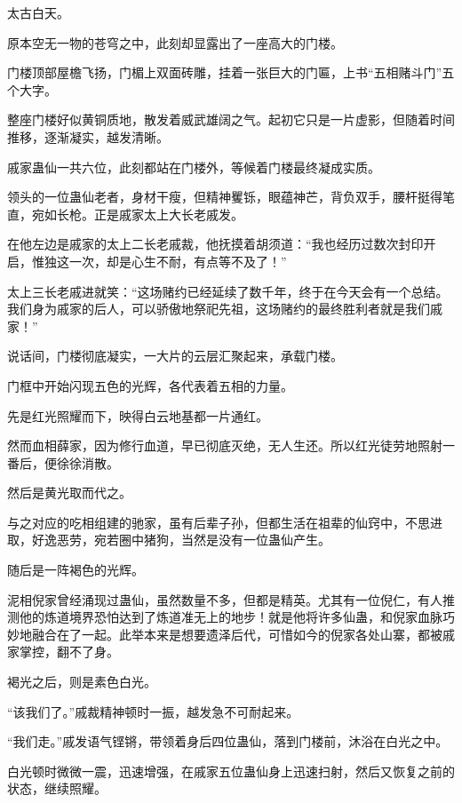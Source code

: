 
\begin{this_body}



太古白天。

原本空无一物的苍穹之中，此刻却显露出了一座高大的门楼。

门楼顶部屋檐飞扬，门楣上双面砖雕，挂着一张巨大的门匾，上书“五相赌斗门”五个大字。

整座门楼好似黄铜质地，散发着威武雄阔之气。起初它只是一片虚影，但随着时间推移，逐渐凝实，越发清晰。

戚家蛊仙一共六位，此刻都站在门楼外，等候着门楼最终凝成实质。

领头的一位蛊仙老者，身材干瘦，但精神矍铄，眼蕴神芒，背负双手，腰杆挺得笔直，宛如长枪。正是戚家太上大长老戚发。

在他左边是戚家的太上二长老戚裁，他抚摸着胡须道：“我也经历过数次封印开启，惟独这一次，却是心生不耐，有点等不及了！”

太上三长老戚进就笑：“这场赌约已经延续了数千年，终于在今天会有一个总结。我们身为戚家的后人，可以骄傲地祭祀先祖，这场赌约的最终胜利者就是我们戚家！”

说话间，门楼彻底凝实，一大片的云层汇聚起来，承载门楼。

门框中开始闪现五色的光辉，各代表着五相的力量。

先是红光照耀而下，映得白云地基都一片通红。

然而血相薛家，因为修行血道，早已彻底灭绝，无人生还。所以红光徒劳地照射一番后，便徐徐消散。

然后是黄光取而代之。

与之对应的吃相组建的驰家，虽有后辈子孙，但都生活在祖辈的仙窍中，不思进取，好逸恶劳，宛若圈中猪狗，当然是没有一位蛊仙产生。

随后是一阵褐色的光辉。

泥相倪家曾经涌现过蛊仙，虽然数量不多，但都是精英。尤其有一位倪仁，有人推测他的炼道境界恐怕达到了炼道准无上的地步！就是他将许多仙蛊，和倪家血脉巧妙地融合在了一起。此举本来是想要遗泽后代，可惜如今的倪家各处山寨，都被戚家掌控，翻不了身。

褐光之后，则是素色白光。

“该我们了。”戚裁精神顿时一振，越发急不可耐起来。

“我们走。”戚发语气铿锵，带领着身后四位蛊仙，落到门楼前，沐浴在白光之中。

白光顿时微微一震，迅速增强，在戚家五位蛊仙身上迅速扫射，然后又恢复之前的状态，继续照耀。


\end{this_body}
